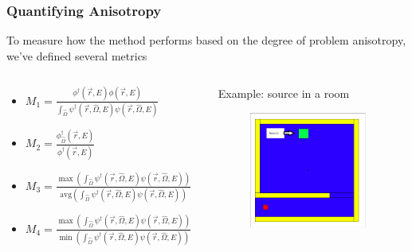\documentclass[xcolor=x11names,compress,handout]{beamer}
\renewcommand{\(}{\begin{columns}}
\renewcommand{\)}{\end{columns}}
\newcommand{\<}[1]{\begin{column}{#1}}
\renewcommand{\>}{\end{column}}
\newcommand{\vOmega}{\ensuremath{\hat{\Omega}}}
\newcommand{\vecr}{\vec{r}}
\begin{document}
\begin{frame}[fragile]

  \frametitle{Quantifying Anisotropy}
  
  To measure how the method performs based on the degree of problem anisotropy, we've defined several metrics
  \vspace*{1em}
    \begin{columns}
    \begin{column}{0.5\textwidth}
      \begin{itemize}
      \item $M_{1} = \frac{\phi^{\dagger}(\vecr,E)\phi(\vecr,E)}{\int_{\vOmega}\psi^{\dagger}(\vecr,\vOmega,E)\psi(\vecr,\vOmega,E)}$
      \item $M_{2} = \frac{\phi^{\dagger}_{\vOmega}(\vecr,E)}{\phi^{\dagger}(\vecr,E)}$
      \item $M_{3} = \frac{\max(\int_{\vOmega}\psi^{\dagger}(\vecr,\vOmega,E)\psi(\vecr,\vOmega,E))}{\text{avg}(\int_{\vOmega}\psi^{\dagger}(\vecr,\vOmega,E)\psi(\vecr,\vOmega,E))}$
       \item $M_{4} = \frac{\max(\int_{\vOmega}\psi^{\dagger}(\vecr,\vOmega,E)\psi(\vecr,\vOmega,E))}{\min(\int_{\vOmega}\psi^{\dagger}(\vecr,\vOmega,E)\psi(\vecr,\vOmega,E))}$
      \end{itemize}
    \end{column}    
    \begin{column}{0.5\textwidth}
    Example: source in a room
      	\begin{figure}
  	\begin{center}
  		\includegraphics[height=1.5in,clip]{../figs/therapy-room.png}
	\end{center}
  	\end{figure}
    \end{column}
  \end{columns}   

\end{frame}
\end{document}
